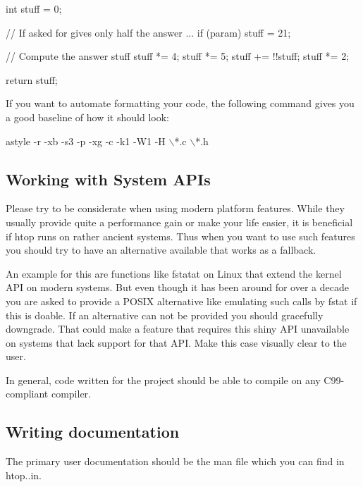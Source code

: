 \begin{DoxyCode}
\textcolor{keywordtype}{int} stuff = 0;

\textcolor{comment}{// If asked for gives only half the answer ...}
\textcolor{keywordflow}{if} (param)
   stuff = 21;

\textcolor{comment}{// Compute the answer}
stuff %
stuff *= 4;
stuff *= 5;
stuff += !!stuff;
stuff *= 2;

\textcolor{keywordflow}{return} stuff;
\end{DoxyCode}


If you want to automate formatting your code, the following command gives you a good baseline of how it should look\+:


\begin{DoxyCode}
astyle -r -xb -s3 -p -xg -c -k1 -W1 -H \(\backslash\)*.c \(\backslash\)*.h
\end{DoxyCode}


\subsection*{Working with System A\+P\+Is }

Please try to be considerate when using modern platform features. While they usually provide quite a performance gain or make your life easier, it is beneficial if {\ttfamily htop} runs on rather ancient systems. Thus when you want to use such features you should try to have an alternative available that works as a fallback.

An example for this are functions like {\ttfamily fstatat} on Linux that extend the kernel A\+PI on modern systems. But even though it has been around for over a decade you are asked to provide a P\+O\+S\+IX alternative like emulating such calls by {\ttfamily fstat} if this is doable. If an alternative can not be provided you should gracefully downgrade. That could make a feature that requires this shiny A\+PI unavailable on systems that lack support for that A\+PI. Make this case visually clear to the user.

In general, code written for the project should be able to compile on any C99-\/compliant compiler.

\subsection*{Writing documentation }

The primary user documentation should be the man file which you can find in {\ttfamily htop..\+in}.

